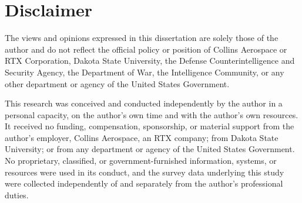 \section{Disclaimer}
The views and opinions expressed in this dissertation are solely those of the author and do not reflect the official policy or position of Collins Aerospace or RTX Corporation, Dakota State University, the Defense Counterintelligence and Security Agency, the Department of War, the Intelligence Community, or any other department or agency of the United States Government.

This research was conceived and conducted independently by the author in a personal capacity, on the author's own time and with the author's own resources. It received no funding, compensation, sponsorship, or material support from the author's employer, Collins Aerospace, an RTX company; from Dakota State University; or from any department or agency of the United States Government. No proprietary, classified, or government-furnished information, systems, or resources were used in its conduct, and the survey data underlying this study were collected independently of and separately from the author's professional duties.
\clearpage
